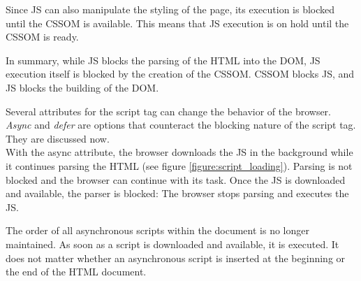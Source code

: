 






Since JS can also manipulate the styling of the page, its execution is blocked until the CSSOM is available.
This means that JS execution is on hold until the CSSOM is ready.

In summary, while JS blocks the parsing of the HTML into the DOM, JS execution itself is blocked by the creation of the CSSOM.
CSSOM blocks JS, and JS blocks the building of the DOM. %

Several attributes for the script tag can change the behavior of the browser.
\textit{Async} and \textit{defer} are options that counteract the blocking nature of the script tag.
They are discussed now. \\




With the async attribute, the browser downloads the JS in the background while it continues parsing the HTML (see figure \ref{figure:script_loading}).
Parsing is not blocked and the browser can continue with its task. 
Once the JS is downloaded and available, the parser is blocked: The browser stops parsing and executes the JS. %

The order of all asynchronous scripts within the document is no longer maintained.
As soon as a script is downloaded and available, it is executed.
It does not matter whether an asynchronous script is inserted at the beginning or the end of the HTML document. %

